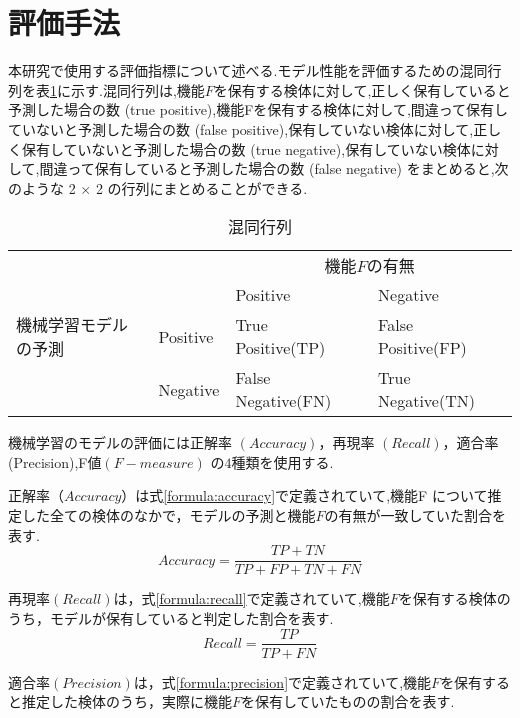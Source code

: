 \documentclass{thesis}
\begin{document}
\section{評価手法}
本研究で使用する評価指標について述べる.モデル性能を評価するための混同行列を表\ref{混同行列}に示す.混同行列は,機能$F$を保有する検体に対して,正しく保有していると予測した場合の数 (true positive),機能Fを保有する検体に対して,間違って保有していないと予測した場合の数 (false positive),保有していない検体に対して,正しく保有していないと予測した場合の数 (true negative),保有していない検体に対して,間違って保有していると予測した場合の数 (false negative) をまとめると,次のような 2 × 2 の行列にまとめることができる.

\begin{table}[H]
	\caption{混同行列}
      \label{混同行列}
	\begin{center}
		\begin{tabular}{|l|l|l|l|} \hline
			\multicolumn{2}{|c|}{} & \multicolumn{2}{|c|}{機能$F$の有無} \\ \cline{3-4}
			\multicolumn{2}{|c|}{} & Positive & Negative \\ \hline
			機械学習モデルの予測 & Positive & True Positive(TP) & False Positive(FP) \\ \cline{2-4}
			& Negative & False Negative(FN) & True Negative(TN) \\ \hline
		\end{tabular}
	\end{center}
\end{table}

機械学習のモデルの評価には正解率 $(Accuracy)$，再現率 $(Recall)$，適合率 (Precision),F値$(F-measure)$ の$4$種類を使用する.


正解率（$Accuracy$）は式\ref{formula:accuracy}で定義されていて,機能F について推定した全ての検体のなかで，モデルの予測と機能$F$の有無が一致していた割合を表す.
\begin{equation}
	\label{formula:accuracy}
	Accuracy = \frac{TP + TN}{TP + FP + TN + FN}
\end{equation}


再現率$(Recall)$は，式\ref{formula:recall}で定義されていて,機能$F$を保有する検体のうち，モデルが保有していると判定した割合を表す.
\begin{equation}
	\label{formula:recall}
	Recall = \frac{TP}{TP + FN}
\end{equation}

適合率$(Precision)$は，式\ref{formula:precision}で定義されていて,機能$F$を保有すると推定した検体のうち，実際に機能$F$を保有していたものの割合を表す.
\end{document}
